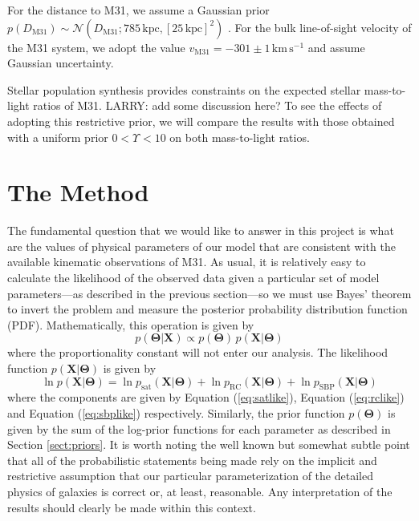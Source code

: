 \documentclass[preprint,12pt]{aastex}
\newcommand{\eqlabel}[1]{\label{eq:#1}}
\newcommand{\eq}[1]{Equation (\ref{eq:#1})}
\newcommand{\sect}[1]{Section \ref{sect:#1}}
\newcommand{\bvec}[1]{\ensuremath{\boldsymbol{#1}}}
\newcommand{\normal}[3]{\ensuremath{\mathcal{N} (#1 ; #2, #3)}}
\renewcommand{\vector}[1]{\ensuremath{\bvec{#1}}}
\newcommand{\model}{\vector{\Theta}}
\newcommand{\data}{\vector{X}}
\newcommand{\prob}{\ensuremath{p}}
\newcommand{\pr}{\prob}
\newcommand{\unit}[1]{\,\mathrm{#1}}
\newcommand{\kpc}{\unit{kpc}}
\newcommand{\sat}{\mathrm{sat}}
\newcommand{\rc}{\mathrm{RC}}
\newcommand{\sbp}{\mathrm{SBP}}
\newcommand{\distand}{\ensuremath{D_\mathrm{M31}}}
\newcommand{\vlosand}{\ensuremath{v_\mathrm{M31}}}
\newcommand{\mtol}[1]{\ensuremath{\Upsilon_{#1}}}
\begin{document}
For the distance to M31, we assume a Gaussian prior
$\pr(\distand) \sim \normal{\distand}{785\kpc}{[25\kpc]^2}$
\citep{McConnachie:2005,McConnachie:2006}. For the bulk line-of-sight
velocity of the M31 system, we adopt the value
$\vlosand = -301\pm 1 \unit{km\,s^{-1}}$ \citep{Courteau:1999} and assume
Gaussian uncertainty.

Stellar population synthesis provides constraints on the expected stellar
mass-to-light ratios of M31. LARRY: add some discussion here?
To see the effects of adopting this restrictive prior, we will
compare the results with those obtained with a uniform prior
$0 < \mtol{} < 10$ on both mass-to-light ratios.

\section{The Method}

The fundamental question that we would like to answer in this project is
what are the values of physical parameters of our model that are consistent
with the available kinematic observations of M31. As usual, it is relatively
easy to calculate the likelihood of the observed data given a particular set
of model parameters---as described in the previous section---so we must use
Bayes' theorem to invert the problem and measure the posterior probability
distribution function (PDF). Mathematically, this operation is given by
\begin{equation}\eqlabel{posteriorprob}
    \pr (\model | \data) \propto \pr (\model) \, \pr (\data |\model)
\end{equation}
where the proportionality constant will not enter our analysis.
The likelihood function $\pr (\data | \model)$ is given by
\begin{equation}\eqlabel{fulllikelihood}
    \ln \pr (\data |\model) = \ln \pr_\sat (\data | \model)
    + \ln \pr_\rc (\data | \model) + \ln \pr_\sbp (\data | \model)
\end{equation}
where the components are given by \eq{satlike}, \eq{rclike} and \eq{sbplike}
respectively. Similarly, the prior function $\pr (\model)$ is given by the
sum of the log-prior functions for each parameter as described in
\sect{priors}. It is worth noting the well known but somewhat subtle point
that all of the probabilistic statements being made rely on the implicit and
restrictive assumption that our particular parameterization of the detailed
physics of galaxies is correct or, at least, reasonable. Any interpretation
of the results should clearly be made within this context.
\end{document}
